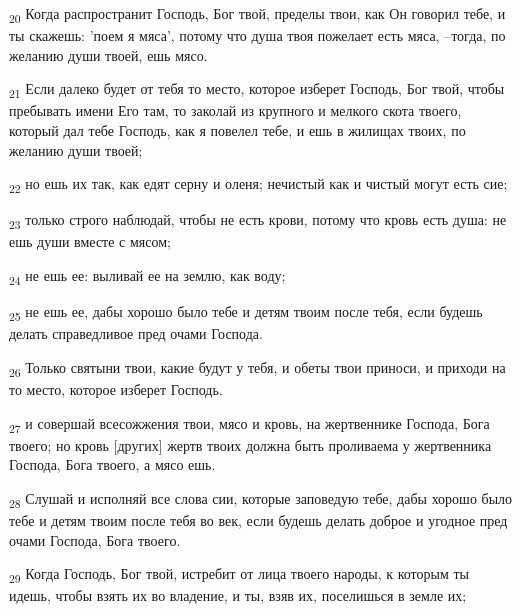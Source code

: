 \begin{tcolorbox}
\textsubscript{20} Когда распространит Господь, Бог твой, пределы твои, как Он говорил тебе, и ты скажешь: 'поем я мяса', потому что душа твоя пожелает есть мяса, --тогда, по желанию души твоей, ешь мясо.
\end{tcolorbox}
\begin{tcolorbox}
\textsubscript{21} Если далеко будет от тебя то место, которое изберет Господь, Бог твой, чтобы пребывать имени Его там, то заколай из крупного и мелкого скота твоего, который дал тебе Господь, как я повелел тебе, и ешь в жилищах твоих, по желанию души твоей;
\end{tcolorbox}
\begin{tcolorbox}
\textsubscript{22} но ешь их так, как едят серну и оленя; нечистый как и чистый могут есть сие;
\end{tcolorbox}
\begin{tcolorbox}
\textsubscript{23} только строго наблюдай, чтобы не есть крови, потому что кровь есть душа: не ешь души вместе с мясом;
\end{tcolorbox}
\begin{tcolorbox}
\textsubscript{24} не ешь ее: выливай ее на землю, как воду;
\end{tcolorbox}
\begin{tcolorbox}
\textsubscript{25} не ешь ее, дабы хорошо было тебе и детям твоим после тебя, если будешь делать справедливое пред очами Господа.
\end{tcolorbox}
\begin{tcolorbox}
\textsubscript{26} Только святыни твои, какие будут у тебя, и обеты твои приноси, и приходи на то место, которое изберет Господь.
\end{tcolorbox}
\begin{tcolorbox}
\textsubscript{27} и совершай всесожжения твои, мясо и кровь, на жертвеннике Господа, Бога твоего; но кровь [других] жертв твоих должна быть проливаема у жертвенника Господа, Бога твоего, а мясо ешь.
\end{tcolorbox}
\begin{tcolorbox}
\textsubscript{28} Слушай и исполняй все слова сии, которые заповедую тебе, дабы хорошо было тебе и детям твоим после тебя во век, если будешь делать доброе и угодное пред очами Господа, Бога твоего.
\end{tcolorbox}
\begin{tcolorbox}
\textsubscript{29} Когда Господь, Бог твой, истребит от лица твоего народы, к которым ты идешь, чтобы взять их во владение, и ты, взяв их, поселишься в земле их;
\end{tcolorbox}
